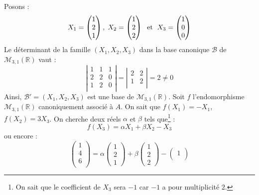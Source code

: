 \documentclass[a4paper,twoside,french,10pt]{VcCours}
\begin{document}
\begin{enumerate}
Posons :
$$ X_1 = \begin{pmatrix}
1 \\
2 \\
1 \\
\end{pmatrix}, \; X_2 = \begin{pmatrix}
1 \\
2 \\
2 \\
\end{pmatrix} \; \hbox{ et } \; X_3=\begin{pmatrix}
1 \\
0 \\
0 \\
\end{pmatrix}$$
Le déterminant de la famille $(X_1, X_2,X_3)$ dans la base canonique $\mathcal{B}$ de $\mathcal{M}_{3,1}(\mathbb{R})$ vaut :
$$ \left\vert \begin{array}{ccc}
1 & 1 & 1 \\
2 & 2 & 0 \\
1 & 2 & 0 \\
\end{array}\right\vert = \left\vert \begin{array}{cc}
2 & 2 \\
1 & 2  \\
\end{array}\right\vert = 2 \neq 0$$
Ainsi, $\mathcal{B}'=(X_1, X_2, X_3)$ est une base de $\mathcal{M}_{3,1}(\mathbb{R})$. Soit $f$ l'endomorphisme $\mathcal{M}_{3,1}(\mathbb{R})$ canoniquement associé à $A$. On sait que $f(X_1)=-X_1$, $f(X_2)=3X_3$. On cherche deux réels $\alpha$ et $\beta$ tels que\footnote{On sait que le coefficient de $X_3$ sera $-1$ car $-1$ a pour multiplicité $2$.} :
$$ f(X_3) = \alpha X_1 + \beta X_2 - X_3$$
ou encore :
$$ \begin{pmatrix}
1 \\
4 \\
6 \\
\end{pmatrix} = \alpha \begin{pmatrix}
1 \\
2 \\
1
\end{pmatrix} + \beta \begin{pmatrix}
1 \\
2 \\
2
\end{pmatrix} -  \begin{pmatrix}
1 \\

\end{pmatrix}$$
\end{enumerate}
\end{document}
